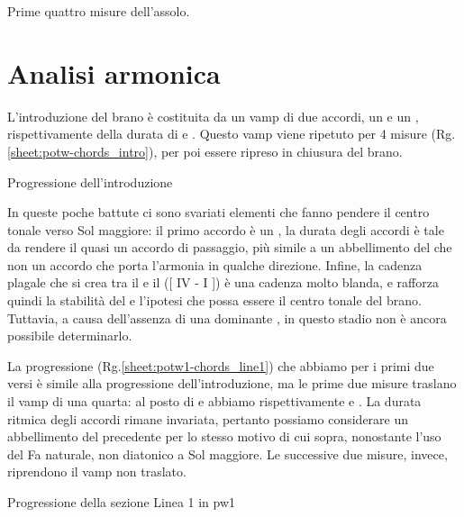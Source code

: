 \documentclass[class=book, crop=false, oneside, 12pt]{standalone}
\begin{document}
    \begin{sheet}[htbp]
        \centering
        \caption{Prime quattro misure dell'assolo.}
        \label{sheet:potw-phrases_solo}
    \end{sheet}

    
    \section{Analisi armonica}
    \label{sec:03-harmony}
    L'introduzione del brano è costituita da un vamp di due accordi, un  e un {,} rispettivamente della durata di  e . Questo vamp viene ripetuto per 4 misure (Rg.\ref{sheet:potw-chords_intro}), per poi essere ripreso in chiusura del brano. 
    \begin{sheet}[htbp]
        \centering
        \caption{Progressione dell'introduzione}
        \label{sheet:potw-chords_intro}
    \end{sheet}
    
    In queste poche battute ci sono svariati elementi che fanno pendere il centro tonale verso Sol maggiore: il primo accordo è un , la durata degli accordi è tale da rendere il  quasi un accordo di passaggio, più simile a un abbellimento del  che non un accordo che porta l'armonia in qualche direzione. Infine, la cadenza plagale che si crea tra il  e il  ([ IV - I ]) è una cadenza molto blanda, e rafforza quindi la stabilità del  e l'ipotesi che possa essere il centro tonale del brano. Tuttavia, a causa dell'assenza di una dominante , in questo stadio non è ancora possibile determinarlo.

    La progressione (Rg.\ref{sheet:potw1-chords_line1}) che abbiamo per i primi due versi  è simile alla progressione dell'introduzione, ma le prime due misure traslano il vamp di una quarta: al posto di  e  abbiamo rispettivamente  e . La durata ritmica degli accordi rimane invariata, pertanto possiamo considerare  un abbellimento del precedente  per lo stesso motivo di cui sopra, nonostante l'uso del Fa naturale, non diatonico a Sol maggiore. Le successive due misure, invece, riprendono il vamp non traslato. 
    
    \begin{sheet}[htbp]
        \centering
        \caption{Progressione della sezione Linea 1 in \acrshort{pw1}}
        \label{sheet:potw1-chords_line1}
    \end{sheet}
    
\end{document}
